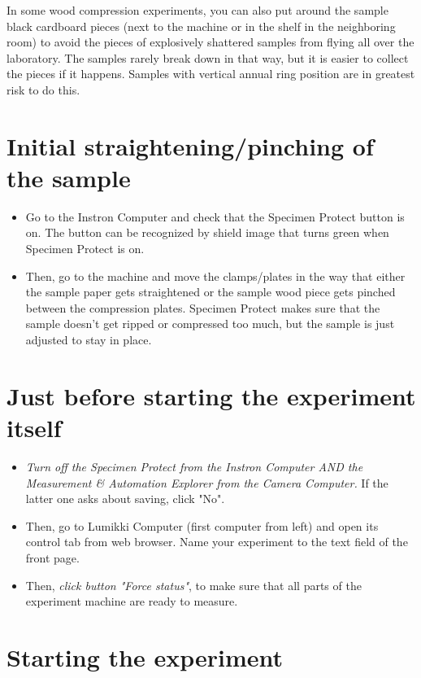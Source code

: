 \documentclass[a4paper]{article}
\begin{document}
In some wood compression experiments, you can also put around the sample 
black cardboard pieces (next to the machine or in the shelf in the neighboring 
room) to avoid the pieces of explosively shattered samples from flying all 
over the laboratory. The samples rarely break down in that way, but it is 
easier to collect the pieces if it happens. Samples with vertical annual ring 
position are in greatest risk to do this.

\section{Initial straightening/pinching of the sample} 

\begin{itemize}
  \item Go to the Instron Computer and check that the Specimen Protect button is on. The button can be recognized by shield image that turns green when Specimen Protect is on.
  \item Then, go to the machine and move the clamps/plates in the way that either the sample paper gets straightened or the sample wood piece gets pinched between the compression plates. Specimen Protect makes sure that the sample doesn't get ripped or compressed too much, but the sample is just adjusted to stay in place.
\end{itemize}

\section{Just before starting the experiment itself} 

\begin{itemize}
  \item \textit{Turn off the Specimen Protect from the Instron Computer AND the Measurement \& Automation Explorer from the Camera Computer.} If the latter one asks about saving, click "No".
  \item Then, go to Lumikki Computer (first computer from left) and open its control tab from web browser. Name your experiment to the text field of the front page.
  \item Then, \textit{click button "Force status"}, to make sure that all parts of the experiment machine are ready to measure. 
\end{itemize}

\section{Starting the experiment} 
\end{document}
